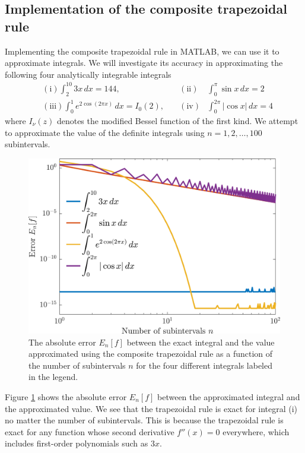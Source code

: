 \documentclass[11pt]{article}
\begin{document}
\subsection{Implementation of the composite trapezoidal rule}
Implementing the composite trapezoidal rule in MATLAB, we can use it to approximate integrals. We will investigate its accuracy in approximating the following four analytically integrable integrals
\begin{align*}
  & \mathrm{(i)} \int_2^{10} 3x \, dx = 144, \quad
    & \mathrm{(ii)} & \int_0^\pi \sin x \, dx = 2 \\
  & \mathrm{(iii)} \int_0^1 e^{2\cos(2\pi x)} \, dx = I_0(2), \quad
    & \mathrm{(iv)}&  \int_0^{2\pi} |\cos x| \, dx = 4
\end{align*}
where $I_\nu(z)$ denotes the modified Bessel function of the first kind. We attempt to approximate the value of the definite integrals using $n=1,2,\dots,100$ subintervals.

\begin{figure}[!htb]
  \centering
  \includegraphics[width=\linewidth]{trapezoid_error.png}
  \caption{The absolute error $E_n[f]$ between the exact integral and the value approximated using the composite trapezoidal rule as a function of the number of subintervals $n$ for the four different integrals labeled in the legend.}
  \label{fig:trapezoid_error}
\end{figure}

Figure \ref{fig:trapezoid_error} shows the absolute error $E_n[f]$ between the approximated integral and the approximated value. We see that the trapezoidal rule is exact for integral (i) no matter the number of subintervals. This is because the trapezoidal rule is exact for any function whose second derivative $f''(x) = 0$ everywhere, which includes first-order polynomials such as $3x$.
\end{document}

